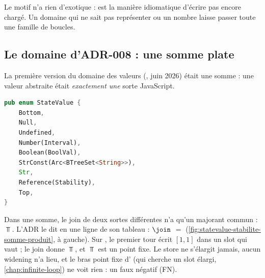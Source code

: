 Le motif n'a rien d'exotique :  est la manière
idiomatique d'écrire \og pas encore chargé\fg{}. Un domaine qui ne sait pas
représenter \og {} ou un nombre\fg{} laisse passer toute une famille
de boucles.

\subsection{Le domaine d'ADR-008 : une somme plate}

La première version du domaine des valeurs (, juin 2026) était une
somme : une valeur abstraite était \emph{exactement une} sorte JavaScript.

\begin{lstlisting}[language=Rust,caption={L'ancien \code{StateValue} (\file{docs/adr/ADR-008-value-domain.md}, élagué des commentaires)},label={lst:statevalue-stabilite-adr8}]
pub enum StateValue {
    Bottom,
    Null,
    Undefined,
    Number(Interval),
    Boolean(BoolVal),
    StrConst(Arc<BTreeSet<String>>),
    Str,
    Reference(Stability),
    Top,
}
\end{lstlisting}

Dans une somme, le join de deux sortes différentes n'a qu'un majorant
commun : $\Top$. L'ADR le dit en une ligne de son tableau :
 $\join$  $=$ 
(\cref{fig:statevalue-stabilite-somme-produit}, à gauche). Sur
, le premier tour écrit $[1,1]$ dans un slot qui vaut
 ; le join donne $\Top$, et $\Top$ est un point fixe. Le store ne
s'élargit jamais, aucun widening n'a lieu, et le bras \og point fixe\fg{}
d' (qui cherche un slot élargi,
\cref{chap:infinite-loop}) ne voit rien : un faux négatif (FN).

